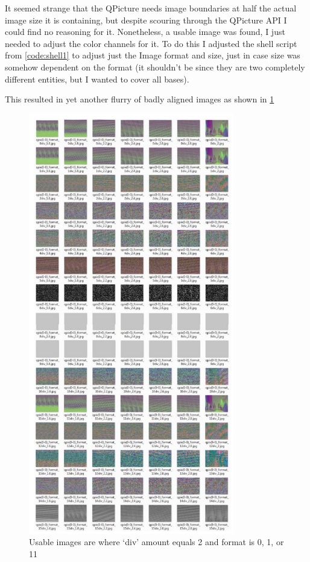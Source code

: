 It seemed strange that the QPicture needs image boundaries at half the actual image size it is containing, but despite scouring through the QPicture API I could find no reasoning for it. Nonetheless, a usable image was found, I just needed to adjust the color channels for it.
To do this I adjusted the shell script from \cref{code:shell1} to adjust just the Image format and size, just in case size was somehow dependent on the format (it shouldn’t be since they are two completely different entities, but I wanted to cover all bases).
\pagebreak
\begin{frame}[fragile]
	
\end{frame}
This resulted in yet another flurry of badly aligned images as shown in \cref{fig:shell2}
\begin{figure}
	\begin{center}
		\includegraphics[width=0.8\textwidth]{../images/qpix/shell2}
	\end{center}
	\vspace{-20pt}
	\caption{Usable images are where ‘div’ amount equals 2 and format is 0, 1, or 11}
	\label{fig:shell2}
\end{figure}

